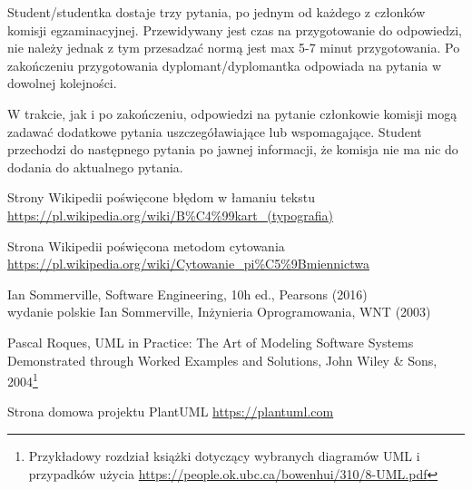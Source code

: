 \documentclass[12pt,a4paper]{article}
\begin{document}
Student/studentka dostaje trzy pytania, po jednym od każdego z członków komisji egzaminacyjnej. Przewidywany jest czas na przygotowanie do odpowiedzi, nie należy jednak z tym przesadzać normą jest max 5-7 minut przygotowania. Po zakończeniu przygotowania dyplomant/dyplomantka odpowiada na pytania w dowolnej kolejności.

W trakcie, jak i po zakończeniu, odpowiedzi na pytanie członkowie komisji mogą zadawać dodatkowe pytania uszczegóławiające lub wspomagające. Student przechodzi do następnego pytania po jawnej informacji, że komisja nie ma nic do dodania do aktualnego pytania.




 Strony Wikipedii poświęcone błędom w łamaniu tekstu\\
\url{https://pl.wikipedia.org/wiki/B%C4%99kart_(typografia)}

 Strona Wikipedii poświęcona metodom cytowania \\
\url{https://pl.wikipedia.org/wiki/Cytowanie_pi%C5%9Bmiennictwa}

 Ian Sommerville, Software Engineering, 10h ed., Pearsons  (2016)\\
 wydanie polskie Ian Sommerville, Inżynieria Oprogramowania, WNT (2003)

 Pascal Roques, UML in Practice: The Art of Modeling Software Systems Demonstrated through Worked Examples and Solutions, John Wiley \& Sons, 2004\footnote{Przykładowy rozdział książki dotyczący wybranych diagramów UML i przypadków użycia \url{https://people.ok.ubc.ca/bowenhui/310/8-UML.pdf}}

 Strona domowa projektu PlantUML \url{https://plantuml.com}
\end{document}
